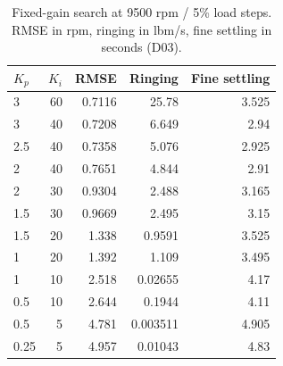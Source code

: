 \begin{table}[htbp]\centering\small\setlength{\tabcolsep}{4pt}\begin{tabular}{@{}lrrrr@{}}\toprule
$K_p$ & $K_i$ & RMSE & Ringing & Fine settling\\\midrule
3 & 60 & 0.7116 & 25.78 & 3.525\\
3 & 40 & 0.7208 & 6.649 & 2.94\\
2.5 & 40 & 0.7358 & 5.076 & 2.925\\
2 & 40 & 0.7651 & 4.844 & 2.91\\
2 & 30 & 0.9304 & 2.488 & 3.165\\
1.5 & 30 & 0.9669 & 2.495 & 3.15\\
1.5 & 20 & 1.338 & 0.9591 & 3.525\\
1 & 20 & 1.392 & 1.109 & 3.495\\
1 & 10 & 2.518 & 0.02655 & 4.17\\
0.5 & 10 & 2.644 & 0.1944 & 4.11\\
0.5 & 5 & 4.781 & 0.003511 & 4.905\\
0.25 & 5 & 4.957 & 0.01043 & 4.83\\
\bottomrule\end{tabular}\caption{Fixed-gain search at 9500 rpm / 5\% load steps. RMSE in rpm, ringing in lbm/s, fine settling in seconds (D03).}\label{tab:lowgain}\end{table}